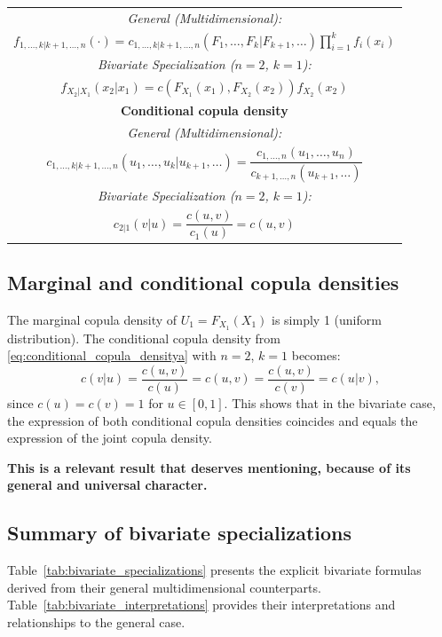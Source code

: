 \begin{table}[htpb]
\begin{tabular}{|c|}
\textit{General (Multidimensional):} \\[2pt]
$f_{1,\ldots,k|k+1,\ldots,n}(\cdot)=c_{1,\ldots,k|k+1,\ldots,n}(F_1,\ldots,F_k|F_{k+1},\ldots)\prod_{i=1}^k f_i(x_i)$ \\[6pt]
\textit{Bivariate Specialization ($n=2$, $k=1$):} \\[2pt]
$f_{X_2|X_1}(x_2|x_1) = c(F_{X_1}(x_1),F_{X_2}(x_2))f_{X_2}(x_2)$ \\[4pt]
\hline
\textbf{Conditional copula density} \\
\hline
\textit{General (Multidimensional):} \\[2pt]
$c_{1,\ldots,k|k+1,\ldots,n}(u_1,\ldots,u_k|u_{k+1},\ldots)=\dfrac{c_{1,\ldots,n}(u_1,\ldots,u_n)}{c_{k+1,\ldots,n}(u_{k+1},\ldots)}$ \\[6pt]
\textit{Bivariate Specialization ($n=2$, $k=1$):} \\[2pt]
$c_{2|1}(v|u)=\dfrac{c(u,v)}{c_1(u)}=c(u,v)$ \\[4pt]
\hline
\end{tabular}
\end{table}

\subsection{Marginal and conditional copula densities}\label{subsec:bivariate_copula_densities}
The marginal copula density of $U_1 = F_{X_1}(X_1)$ is simply 1 (uniform distribution). The conditional copula density from \eqref{eq:conditional_copula_densitya} with $n=2$, $k=1$ becomes:
\begin{equation}\label{eq:bivariate_conditional_copula_density}
c(v|u) = \frac{c(u,v)}{c(u)} = c(u,v) = \frac{c(u,v)}{c(v)} = c(u|v)  ,
\end{equation}
since $c(u) = c(v) = 1$ for $u \in [0,1]$. This shows that in the bivariate case, the expression of both conditional copula densities coincides and equals the expression of the joint copula density.

\textbf{This is a relevant result that deserves mentioning, because of its general and universal character.}

\subsection{Summary of bivariate specializations}\label{subsec:bivariate_summary}
Table~\ref{tab:bivariate_specializations} presents the explicit bivariate formulas derived from their general multidimensional counterparts. Table~\ref{tab:bivariate_interpretations} provides their interpretations and relationships to the general case.


